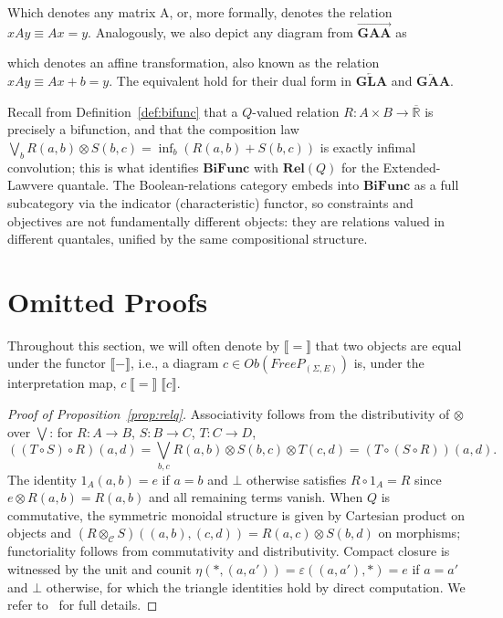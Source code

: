 \begin{figure}[H]
    \centering
    
\end{figure}

Which denotes any matrix A, or, more formally, denotes the relation $xAy \equiv Ax=y$. Analogously, we also depict any diagram from $\overrightarrow{\textbf{GAA}}$ as

\begin{figure}[H]
    \centering
    
\end{figure}

which denotes an affine transformation, also known as the relation $xAy \equiv Ax + b = y$.
The equivalent hold for their dual form in
$\overleftarrow{\textbf{GLA}}$ and $\overleftarrow{\textbf{GAA}}$.

Recall from Definition~\ref{def:bifunc} that a $Q$-valued relation
$R : A \times B \to \overline{\mathbb{R}}$ is precisely a bifunction, and
that the composition law
$\bigvee_b R(a,b)\otimes S(b,c) = \inf_b (R(a,b)+S(b,c))$ is exactly
infimal convolution; this is what identifies $\mathbf{BiFunc}$ with
$\mathbf{Rel}(Q)$ for the Extended-Lawvere quantale. The
Boolean-relations category embeds into $\mathbf{BiFunc}$ as a full
subcategory via the indicator (characteristic) functor, so constraints
and objectives are not fundamentally different objects: they are
relations valued in different quantales, unified by the same
compositional structure.

\section{Omitted Proofs}\label{app:proofs}

Throughout this section, we will often denote by $\llbracket = \rrbracket$
that two objects are equal under the functor $\llbracket - \rrbracket$,
i.e., a diagram $c \in Ob(FreeP_{(\Sigma,E)})$ is, under the
interpretation map, $c \; \llbracket = \rrbracket \; \llbracket c \rrbracket$.

\begin{proof}[Proof of Proposition~\ref{prop:relq}]
	Associativity follows from the distributivity of $\otimes$ over $\bigvee$:
	for $R:A\to B$, $S:B\to C$, $T:C\to D$,
	\[
		((T\circ S)\circ R)(a,d)
		= \bigvee_{b,c} R(a,b)\otimes S(b,c)\otimes T(c,d)
		= (T\circ (S\circ R))(a,d).
	\]
	The identity $1_A(a,b) = e$ if $a=b$ and $\bot$ otherwise satisfies $R\circ 1_A = R$
	since $e\otimes R(a,b) = R(a,b)$ and all remaining terms vanish.
	When $Q$ is commutative, the symmetric monoidal structure is given by Cartesian
	product on objects and $(R\otimes_{\mathcal{C}}S)((a,b),(c,d)) = R(a,c)\otimes S(b,d)$
	on morphisms; functoriality follows from commutativity and distributivity.
	Compact closure is witnessed by the unit and counit
	$\eta(*,(a,a')) = \varepsilon((a,a'),*) = e$ if $a=a'$ and $\bot$ otherwise,
	for which the triangle identities hold by direct computation.
	We refer to~\cite{rosenthal1990quantales} for full details.
\end{proof}

